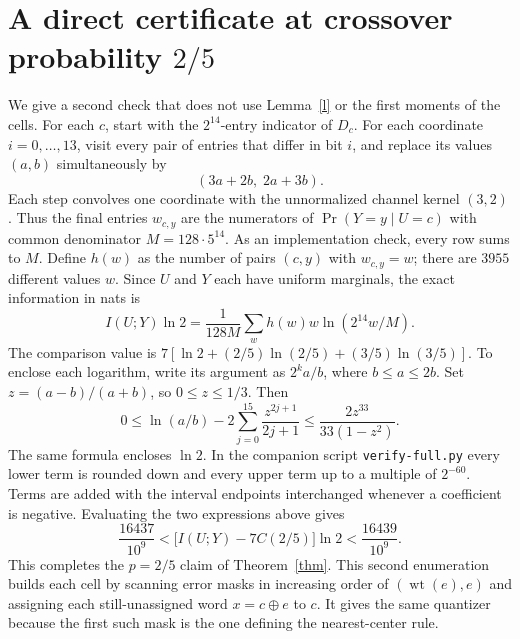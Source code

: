 \documentclass[11pt]{article}
\newcommand{\wt}{\operatorname{wt}}
\begin{document}
\section{A direct certificate at crossover probability $2/5$}\label{full}
We give a second check that does not use Lemma~\ref{l} or the first moments of the cells. For each $c$, start with the $2^{14}$-entry indicator of $D_c$. For each coordinate $i=0,\ldots,13$, visit every pair of entries that differ in bit $i$, and replace its values $(a,b)$ simultaneously by
\[
 (3a+2b,\;2a+3b).
\]
Each step convolves one coordinate with the unnormalized channel kernel $(3,2)$. Thus the final entries $w_{c,y}$ are the numerators of $\Pr(Y=y\mid U=c)$ with common denominator $M=128\cdot5^{14}$. As an implementation check, every row sums to $M$. Define $h(w)$ as the number of pairs $(c,y)$ with $w_{c,y}=w$; there are $3955$ different values $w$. Since $U$ and $Y$ each have uniform marginals, the exact information in nats is
\[
 I(U;Y)\ln 2 = \frac{1}{128M}\sum_{w} h(w)w\ln(2^{14}w/M).
\]
The comparison value is $7[\ln 2+(2/5)\ln(2/5)+(3/5)\ln(3/5)]$. To enclose each logarithm, write its argument as $2^k a/b$, where $b\le a\le2b$. Set $z=(a-b)/(a+b)$, so $0\le z\le1/3$. Then
\[
 0\le \ln(a/b)-2\sum_{j=0}^{15}\frac{z^{2j+1}}{2j+1}
 \le \frac{2z^{33}}{33(1-z^2)}.
\]
The same formula encloses $\ln2$. In the companion script \texttt{verify-full.py} every lower term is rounded down and every upper term up to a multiple of $2^{-60}$. Terms are added with the interval endpoints interchanged whenever a coefficient is negative. Evaluating the two expressions above gives
\[
 \frac{16437}{10^9}
 < \bigl[I(U;Y)-7C(2/5)\bigr]\ln 2
 < \frac{16439}{10^9}.
\]
This completes the $p=2/5$ claim of Theorem~\ref{thm}. This second enumeration builds each cell by scanning error masks in increasing order of $(\wt(e),e)$ and assigning each still-unassigned word $x=c\oplus e$ to $c$. It gives the same quantizer because the first such mask is the one defining the nearest-center rule.
\end{document}
